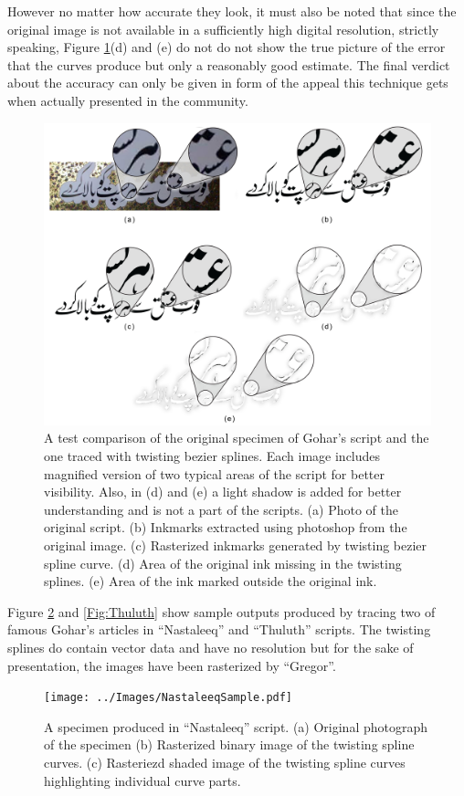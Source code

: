 However no matter how accurate they look, it must also be noted that since the original image is not available in a sufficiently high digital resolution, strictly speaking, Figure \ref{Fig:InkComparison}(d) and (e) do not do not show the true picture of the error that the curves produce but only a reasonably good estimate. The final verdict about the accuracy can only be given in form of the appeal this technique gets when actually presented in the community.

\begin{figure}
  \centering
  \includegraphics[width=1\textwidth]{../Images/InkComparison.jpg}
  \caption{A test comparison of the original specimen of Gohar's script and the one traced with twisting bezier splines. Each image includes magnified version of two typical areas of the script for better visibility. Also, in (d) and (e) a light shadow is added for better understanding and is not a part of the scripts. (a) Photo of the original script. (b) Inkmarks extracted using photoshop from the original image. (c) Rasterized inkmarks generated by twisting bezier spline curve. (d) Area of the original ink missing in the twisting splines. (e) Area of the ink marked outside the original ink.
  }
\label{Fig:InkComparison}
\end{figure}

Figure \ref{Fig:Nastaleeq} and \ref{Fig:Thuluth} show sample outputs produced by tracing two of famous Gohar's articles in ``Nastaleeq'' and ``Thuluth'' scripts. The twisting splines do contain vector data and have no resolution but for the sake of presentation, the images have been rasterized by ``Gregor''.
\begin{figure}
  \centering
  \texttt{[image: ../Images/NastaleeqSample.pdf]}
  \caption{A specimen produced in ``Nastaleeq'' script. (a) Original photograph of the specimen (b) Rasterized binary image of the twisting spline curves. (c) Rasteriezd shaded image of the twisting spline curves highlighting individual curve parts.}
  \label{Fig:Nastaleeq}
\end{figure}

